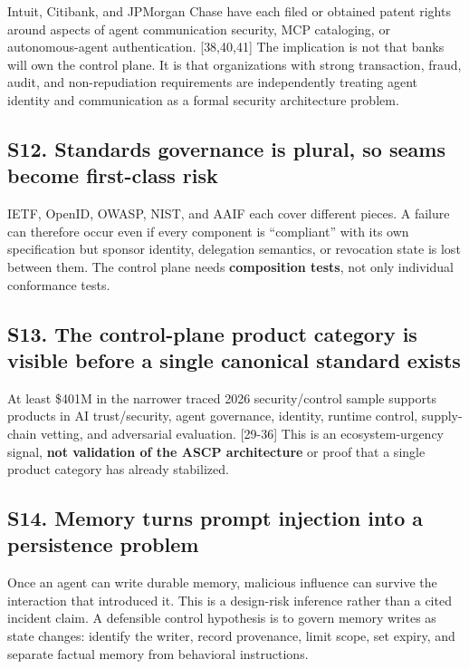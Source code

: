 \documentclass[
  10pt,
  letterpaper,
]{article}
\begin{document}
Intuit, Citibank, and JPMorgan Chase have each filed or obtained patent
rights around aspects of agent communication security, MCP cataloging,
or autonomous-agent authentication. {[}38,40,41{]} The implication is
not that banks will own the control plane. It is that organizations with
strong transaction, fraud, audit, and non-repudiation requirements are
independently treating agent identity and communication as a formal
security architecture problem.

\subsection{S12. Standards governance is plural, so seams become
first-class
risk}\label{s12.-standards-governance-is-plural-so-seams-become-first-class-risk}

IETF, OpenID, OWASP, NIST, and AAIF each cover different pieces. A
failure can therefore occur even if every component is ``compliant''
with its own specification but sponsor identity, delegation semantics,
or revocation state is lost between them. The control plane needs
\textbf{composition tests}, not only individual conformance tests.

\subsection{S13. The control-plane product category is visible before a
single canonical standard
exists}\label{s13.-the-control-plane-product-category-is-visible-before-a-single-canonical-standard-exists}

At least \$401M in the narrower traced 2026 security/control sample
supports products in AI trust/security, agent governance, identity,
runtime control, supply-chain vetting, and adversarial evaluation.
{[}29-36{]} This is an ecosystem-urgency signal, \textbf{not validation
of the ASCP architecture} or proof that a single product category has
already stabilized.

\subsection{S14. Memory turns prompt injection into a persistence
problem}\label{s14.-memory-turns-prompt-injection-into-a-persistence-problem}

Once an agent can write durable memory, malicious influence can survive
the interaction that introduced it. This is a design-risk inference
rather than a cited incident claim. A defensible control hypothesis is
to govern memory writes as state changes: identify the writer, record
provenance, limit scope, set expiry, and separate factual memory from
behavioral instructions.
\end{document}
